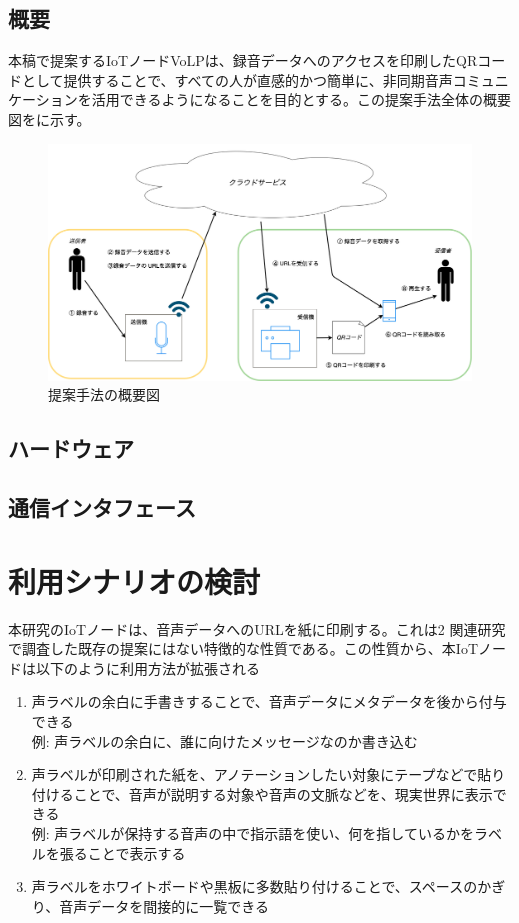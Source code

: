 \documentclass[submit,techrep,noauthor]{ipsj}
\begin{document}
\subsection{概要}
本稿で提案するIoTノードVoLPは、録音データへのアクセスを印刷したQRコードとして提供することで、すべての人が直感的かつ簡単に、非同期音声コミュニケーションを活用できるようになることを目的とする。この提案手法全体の概要図をに示す。\par
\begin{figure}[tb]
\includegraphics[scale=0.15,bb= 0 0 2000 1000]{./image/overview_drawio.png}
\caption{提案手法の概要図}
\label{fig:sys-overview}
\end{figure}

\subsection{ハードウェア}

\subsection{通信インタフェース}

\section{利用シナリオの検討}
本研究のIoTノードは、音声データへのURLを紙に印刷する。これは2 関連研究で調査した既存の提案にはない特徴的な性質である。この性質から、本IoTノードは以下のように利用方法が拡張される
\begin{enumerate}
    \item 声ラベルの余白に手書きすることで、音声データにメタデータを後から付与できる\\例: 声ラベルの余白に、誰に向けたメッセージなのか書き込む
    \item 声ラベルが印刷された紙を、アノテーションしたい対象にテープなどで貼り付けることで、音声が説明する対象や音声の文脈などを、現実世界に表示できる \\例: 声ラベルが保持する音声の中で指示語を使い、何を指しているかをラベルを張ることで表示する
    \item 声ラベルをホワイトボードや黒板に多数貼り付けることで、スペースのかぎり、音声データを間接的に一覧できる
\end{enumerate}
\end{document}

